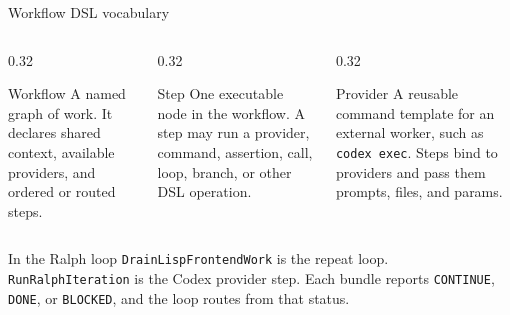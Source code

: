 \documentclass[aspectratio=169]{beamer}
\begin{document}
\begin{frame}{Workflow DSL vocabulary}
\small
\begin{columns}[T,totalwidth=\textwidth]
\begin{column}{0.32\textwidth}
\begin{block}{Workflow}
\footnotesize
A named graph of work. It declares shared context, available providers, and ordered or routed steps.
\end{block}
\end{column}
\begin{column}{0.32\textwidth}
\begin{block}{Step}
\footnotesize
One executable node in the workflow. A step may run a provider, command, assertion, call, loop, branch, or other DSL operation.
\end{block}
\end{column}
\begin{column}{0.32\textwidth}
\begin{block}{Provider}
\footnotesize
A reusable command template for an external worker, such as \texttt{codex exec}. Steps bind to providers and pass them prompts, files, and params.
\end{block}
\end{column}
\end{columns}
\vspace{0.55em}
\begin{block}{In the Ralph loop}
\footnotesize
\texttt{DrainLispFrontendWork} is the repeat loop. \texttt{RunRalphIteration} is the Codex provider step. Each bundle reports \texttt{CONTINUE}, \texttt{DONE}, or \texttt{BLOCKED}, and the loop routes from that status.
\end{block}
\end{frame}
\end{document}
